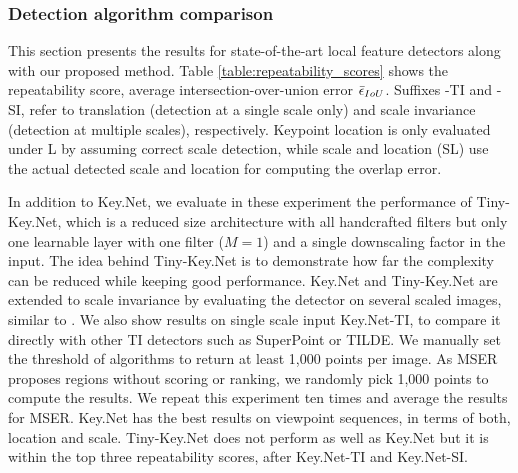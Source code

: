 \subsubsection{Detection algorithm comparison}

This section presents the results for state-of-the-art local feature detectors along with our proposed method. Table \ref{table:repeatability_scores} shows the repeatability score,  average intersection-over-union error $\Bar{\epsilon}_{IoU}$.  Suffixes -TI and -SI, refer to translation (detection at a single scale only) and scale invariance (detection at multiple scales), respectively. Keypoint location is only evaluated under L by assuming correct scale detection, while scale and location (SL) use the actual detected scale and location for computing the overlap error.

In addition to Key.Net, we evaluate in these experiment the performance of Tiny-Key.Net, which is a reduced size architecture with all handcrafted filters but only one learnable layer with one filter  ($M = 1$) and a single downscaling factor in the input. The idea behind Tiny-Key.Net is to demonstrate how far the complexity can be reduced while keeping good performance. Key.Net and Tiny-Key.Net are extended to scale invariance by evaluating the detector on several scaled images, similar to \cite{Zhang_Felix_CVPR_17}. We also show results on single scale input Key.Net-TI, to compare it directly with other TI detectors such as SuperPoint or TILDE. We manually set the threshold of algorithms to return at least 1,000 points per image. As MSER proposes regions without scoring or ranking, we randomly pick 1,000 points to compute the results. We repeat this experiment ten times and average the results for MSER. Key.Net has the best results on viewpoint sequences, in terms of both, location and scale. Tiny-Key.Net does not perform as well as Key.Net but it is within the top three repeatability scores, after Key.Net-TI and Key.Net-SI.


